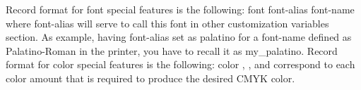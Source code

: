 %
%
%
%
   { Record format for font special features is the following: font  font-alias  font-name where font-alias will serve to call this font in other customization variables section. As example, having font-alias set as palatino for a font-name defined as Palatino-Roman in the printer, you have to recall it as my\_palatino. }
%
   { Record format for color special features is the following: color        , ,  and  correspond to each color amount that is required to produce the desired CMYK color. }
%
   { {\tbdef} }
%
   { {\tbdef} }
%
   { {\tbdef} }
%
   { {\tbdef} }
%
